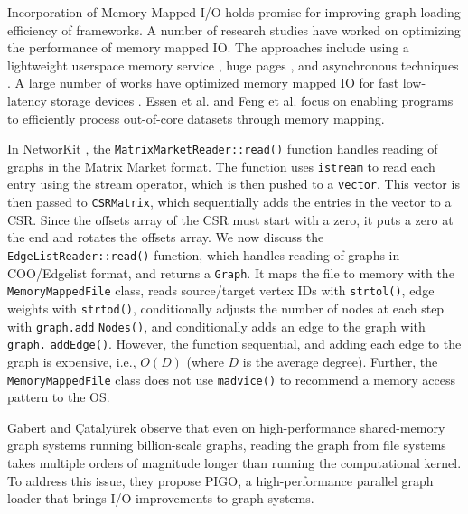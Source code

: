 Incorporation of Memory-Mapped I/O holds promise for improving graph loading efficiency of frameworks. A number of research studies have worked on optimizing the performance of memory mapped IO. The approaches include using a lightweight userspace memory service \cite{li2019userland}, huge pages \cite{malliotakis2021hugemap}, and asynchronous techniques \cite{imamura2019poster}. A large number of works have optimized memory mapped IO for fast low-latency storage devices \cite{song2012low, song2016efficient, papagiannis2020optimizing, papagiannis2021memory, alverti2022daxvm, leis2023virtual}. Essen et al. \cite{van2015di} and Feng et al. \cite{feng2023tricache} focus on enabling programs to efficiently process out-of-core datasets through memory mapping.

In NetworKit \cite{staudt2016networkit}, the \texttt{MatrixMarketReader::read()} function handles reading of graphs in the Matrix Market format. The function uses \texttt{istream} to read each entry using the stream operator, which is then pushed to a \texttt{vector}. This vector is then passed to \texttt{CSRMatrix}, which sequentially adds the entries in the vector to a CSR. Since the offsets array of the CSR must start with a zero, it puts a zero at the end and rotates the offsets array. We now discuss the \texttt{EdgeListReader::read()} function, which handles reading of graphs in COO/Edgelist format, and returns a \texttt{Graph}. It maps the file to memory with the \texttt{MemoryMappedFile} class, reads source/target vertex IDs with \texttt{strtol()}, edge weights with \texttt{strtod()}, conditionally adjusts the number of nodes at each step with \texttt{graph.add} \texttt{Nodes()}, and conditionally adds an edge to the graph with \texttt{graph.} \texttt{addEdge()}. However, the function sequential, and adding each edge to the graph is expensive, i.e., $O(D)$ (where $D$ is the average degree). Further, the \texttt{MemoryMappedFile} class does not use \texttt{madvice()} to recommend a memory access pattern to the OS.

Gabert and Çatalyürek \cite{gabert2021pigo} observe that even on high-performance shared-memory graph systems running billion-scale graphs, reading the graph from file systems takes multiple orders of magnitude longer than running the computational kernel. To address this issue, they propose PIGO, a high-performance parallel graph loader that brings I/O improvements to graph systems.

